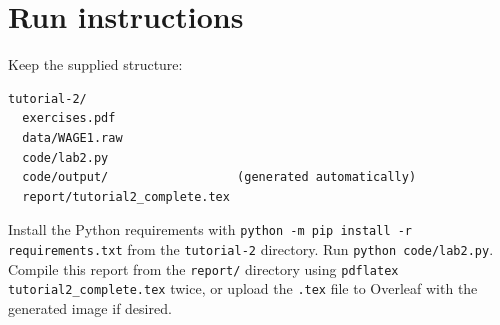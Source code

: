\documentclass[11pt,a4paper]{article}
\begin{document}
\section{Run instructions}
Keep the supplied structure:
\begin{verbatim}
tutorial-2/
  exercises.pdf
  data/WAGE1.raw
  code/lab2.py
  code/output/                  (generated automatically)
  report/tutorial2_complete.tex
\end{verbatim}
Install the Python requirements with \texttt{python -m pip install -r requirements.txt} from the \texttt{tutorial-2} directory. Run \texttt{python code/lab2.py}. Compile this report from the \texttt{report/} directory using \texttt{pdflatex tutorial2\_complete.tex} twice, or upload the \texttt{.tex} file to Overleaf with the generated image if desired.
\end{document}
